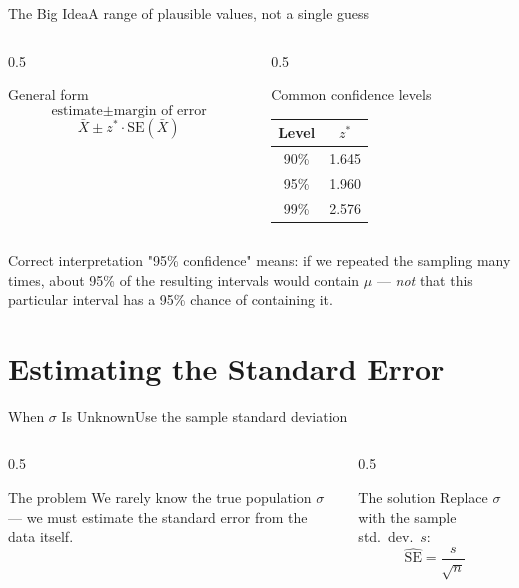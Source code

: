 \documentclass[aspectratio=169,11pt]{beamer}
\begin{document}
\begin{frame}{The Big Idea}{A range of plausible values, not a single guess}
  \begin{columns}[T]
    \begin{column}{0.5\textwidth}
      \begin{block}{General form}
        \[ \text{estimate} \pm \text{margin of error} \]
        \[ \bar X \pm z^\ast \cdot \text{SE}(\bar X) \]
      \end{block}
    \end{column}
    \begin{column}{0.5\textwidth}
      \begin{exampleblock}{Common confidence levels}
        \small
        \renewcommand{\arraystretch}{1.2}
        \begin{tabular}{@{}cc@{}}
          \toprule
          Level & $z^\ast$ \\
          \midrule
          90\% & 1.645 \\
          95\% & 1.960 \\
          99\% & 2.576 \\
          \bottomrule
        \end{tabular}
      \end{exampleblock}
    \end{column}
  \end{columns}
  \vfill
  \begin{alertblock}{Correct interpretation}
    \small "95\% confidence" means: if we repeated the sampling many
    times, about 95\% of the resulting intervals would contain $\mu$ —
    \emph{not} that this particular interval has a 95\% chance of
    containing it.
  \end{alertblock}
\end{frame}

\section{Estimating the Standard Error}

\begin{frame}{When $\sigma$ Is Unknown}{Use the sample standard deviation}
  \begin{columns}[T]
    \begin{column}{0.5\textwidth}
      \begin{alertblock}{The problem}
        \small We rarely know the true population $\sigma$ — we must
        estimate the standard error from the data itself.
      \end{alertblock}
    \end{column}
    \begin{column}{0.5\textwidth}
      \begin{exampleblock}{The solution}
        \small Replace $\sigma$ with the sample std.\ dev.\ $s$:
        \[ \widehat{\text{SE}} = \frac{s}{\sqrt n} \]
      \end{exampleblock}
    \end{column}
  \end{columns}
\end{frame}
\end{document}
